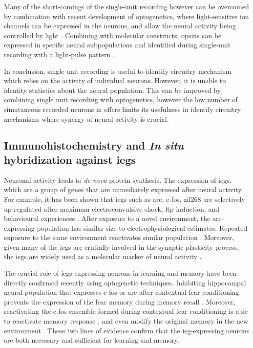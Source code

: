 Many of the short-comings of the single-unit recording however can be overcomed by combination with recent development of optogenetics, where light-sensitive ion channels can be expressed in the neurons, and allow the neural activity being controlled by light . Combining with molecular constructs, opsins can be expressed in specific neural subpopulations and identified during single-unit recording with a light-pulse pattern .  

In conclusion, single unit recording is useful to identify circuitry mechanism which relies on the activity of individual neurons. However, it is unable to identity statistics about the neural population. This can be improved by combining single unit recording with optogenetics, however the low number of simutaneous recorded neurons in offers limits its usefulness in identify circuitry mechanisms where synergy of neural activity is crucial. 

\subsection{Immunohistochemistry and \textit{In situ} hybridization against \glspl{ieg}}
Neuronal activity leads to \textit{de novo} protein synthesis. The expression of \glspl{ieg}, which are a group of genes that are immediately expressed after neural activity. For example, it has been shown that \glspl{ieg} such as \gls{arc}, c-fos, zif268 are selectively up-regulated after maximum electroconvulsive shock, \gls{ltp} induction, and behavioural experiences \citep{guzowski99, vann00, hall01}. After exposure to a novel environment, the \gls{arc}-expressing population has similar size to electrophysiological estimates. Repeated exposure to the same environment reactivates similar population \citep{guzowski06, niibori12}. Moreover, given many of the \glspl{ieg} are crutially involved in the synaptic plasticity process, the \glspl{ieg} are widely used as a molecular marker of neural activity \citep{minatohara15}. 

The crucial role of \glspl{ieg}-expressing neurons in learning and memory have been directly confirmed recently using optogenetic techniques. Inhibiting hippocampal neural population that expresses c-fos or \gls{arc} after contextual fear conditioning prevents the expression of the fear memory during memory recall \citep{denny14, tanaka14}. Moreover, reactivating the c-fos ensemble formed during contextual fear conditioning is able to reactivate memory response \citep{liu12, cowansage14, ohkawa15}, and even modify the original memory in the new environment \citep{ramirez13, redondo14}. These two lines of evidence confirm that the \gls{ieg}-expressing neurons are both necessary and sufficient for learning and memory. 


